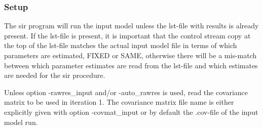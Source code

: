 \subsubsection*{Setup} 
The sir program will run the input model unless the lst-file with results is already present. If the lst-file is present, it
is important that the control stream copy at the top of the lst-file matches the
actual input model file in terms of which parameters are estimated, 
FIXED or SAME, otherwise there will be a mis-match between which parameter estimates are read from the
lst-file and which estimates are needed for the sir procedure.

Unless option -rawres\_input and/or -auto\_rawres is used, read the covariance matrix to be used
in iteration 1.
The covariance matrix file name is either explicitly given with option -covmat\_input
or by default the .cov-file of the input model run.

